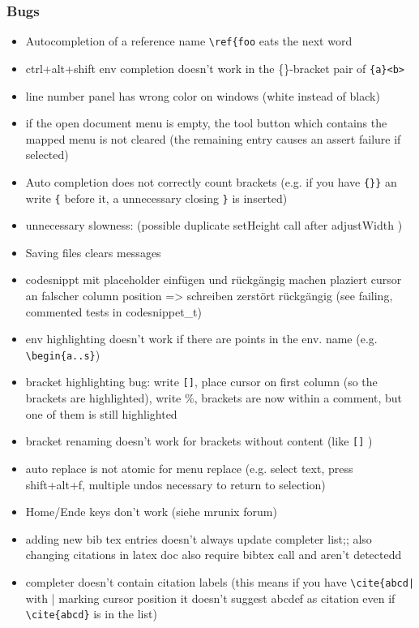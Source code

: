 \documentclass[10pt,a4paper,landscape]{report}
\begin{document}
\subsubsection{Bugs}
\begin{itemize}
\item Autocompletion of a reference name \verb+\ref{foo+ eats the next word
\item ctrl+alt+shift env completion doesn't work in the \{\}-bracket pair of \verb+{a}<b>+ 
\item line number panel has wrong color on windows (white instead of black) 
\item if the open document menu is empty, the tool button which contains the mapped menu is not cleared (the remaining entry causes an assert failure if selected)
\item  Auto completion does not correctly count brackets (e.g. if you have \verb+{}}+ an write \verb+{+ before it, a unnecessary closing \verb+}+ is inserted)
\item unnecessary slowness: (possible duplicate setHeight call after adjustWidth )
\item  Saving files clears messages
\item codesnippt mit placeholder einfügen und rückgängig machen plaziert cursor an falscher column position => schreiben zerstört rückgängig (see failing, commented tests in codesnippet\_t)
\item  env highlighting doesn't work if there are points in the env. name (e.g. \verb+\begin{a..s}+)
\item bracket highlighting bug: write \verb+[]+, place cursor on first column (so the brackets are highlighted), write \%, brackets are now within a comment, but one of them is still highlighted
\item bracket renaming doesn't work for brackets without content (like \verb+[]+ )
\item auto replace is not atomic for menu replace (e.g. select text, press shift+alt+f, multiple undos necessary to return to selection)
\item Home/Ende keys don't work (siehe mrunix forum)
\item adding new bib tex entries doesn't always update completer list;; also changing citations in latex doc also require bibtex call and aren't detectedd
\item completer doesn't contain citation labels (this means if you have \verb+\cite{abcd|+ with | marking cursor position it doesn't suggest abcdef as citation even if \verb+\cite{abcd}+ is in the list)

\end{itemize}
\end{document}
